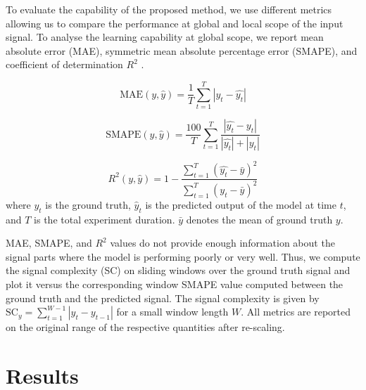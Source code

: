 \documentclass[letterpaper]{article}
\begin{document}
To evaluate the capability of the proposed method, we use different metrics allowing us to compare the performance at global and local scope of the input signal. To analyse the learning capability at global scope, we report mean absolute error (MAE), symmetric mean absolute percentage error (SMAPE), and coefficient of determination $R^2$ \cite{COLINCAMERON1997329}.

\begin{equation}
    \text{MAE}(y, \hat{y}) = \frac{1}{T}\sum^{T}_{t=1}|y_t - \hat{y_t}|
\end{equation}

\begin{equation}
    \text{SMAPE}(y, \hat{y}) = \frac{100}{T} \sum_{t=1}^T \frac{|\hat{y_t}-y_t|}{|\hat{y_t}|+|y_t|}
\end{equation}

\begin{equation}
   R^2(y,\hat{y}) = 1 - \frac{\sum^{T}_{t=1}(\hat{y_t} - \bar{y})^2}{\sum^{T}_{t=1}(y_t - \bar{y})^2}
\end{equation}
where $y_t$ is the ground truth, $\hat{y}_t$ is the predicted output of the model at time $t$, and $T$ is the total experiment duration. $\bar{y}$ denotes the mean of ground truth $y$.

MAE, SMAPE, and $R^2$ values do not provide enough information about the signal parts where the model is performing poorly or very well. Thus, we compute the signal complexity (SC) on sliding windows over the ground truth signal and plot it versus the corresponding window SMAPE value computed between the ground truth and the predicted signal. The signal complexity is given by ${\text{SC}}_y = \sum_{t=1}^{W-1} |y_t - y_{t-1}|$ for a small window length $W$. All metrics are reported on the original range of the respective quantities after re-scaling.

\section{Results}
\label{sec:results}
\end{document}
